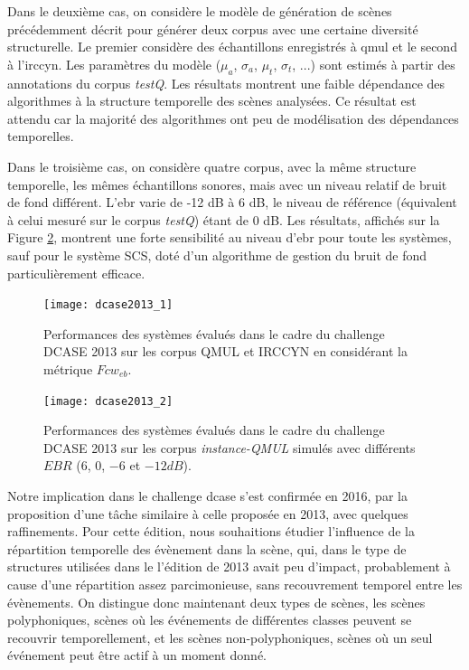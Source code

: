   Dans le deuxième cas, on considère le modèle de génération de scènes précédemment décrit pour générer deux corpus avec une certaine diversité structurelle. Le premier considère des échantillons enregistrés à qmul et le second à l'irccyn. Les paramètres du modèle ($\mu_a$, $\sigma_a$, $\mu_t$, $\sigma_t$, ...) sont estimés à partir des annotations du corpus \emph{testQ}. Les résultats montrent une faible dépendance des algorithmes à la structure temporelle des scènes analysées. Ce résultat est attendu car la majorité des algorithmes ont peu de modélisation des dépendances temporelles.

  Dans le troisième cas, on considère quatre corpus, avec la même structure temporelle, les mêmes échantillons sonores, mais avec un niveau relatif de bruit de fond différent. L'ebr varie de -12 dB à 6 dB, le niveau de référence (équivalent à celui mesuré sur le corpus \emph{testQ})  étant de 0 dB. Les résultats, affichés sur la Figure \ref{fig:ebr}, montrent une forte sensibilité au niveau d'ebr pour toute les systèmes, sauf pour le système SCS, doté d'un algorithme de gestion du bruit de fond particulièrement efficace.

  \begin{figure}[t]
  \texttt{[image: dcase2013\_1]}
  \caption{Performances des systèmes évalués dans le cadre du challenge DCASE 2013 sur les corpus QMUL et IRCCYN en considérant la métrique $Fcw_{eb}$.}
  \label{fig:irccyn}
  \vspace{-4em}
  \end{figure}

  \begin{figure}[t]
  \begin{center}
  \texttt{[image: dcase2013\_2]}
  \caption{Performances des systèmes évalués dans le cadre du challenge DCASE 2013 sur les corpus \emph{instance-QMUL} simulés avec différents $EBR$ ($6$, $0$, $-6$ et $-12dB$).}
  \label{fig:ebr}
  \end{center}
\vspace{-4em}
\end{figure}

  Notre implication dans le challenge dcase s'est confirmée en 2016\cite{mesa}, par la proposition d'une tâche similaire à celle proposée en 2013, avec quelques raffinements. Pour cette édition, nous souhaitions étudier l'influence de la répartition temporelle des évènement dans la scène, qui, dans le type de structures utilisées dans le l'édition de 2013 avait peu d'impact, probablement à cause d'une répartition assez parcimonieuse, sans recouvrement temporel entre les évènements. On distingue donc maintenant deux types de scènes, les scènes polyphoniques, scènes où les événements de différentes classes peuvent se recouvrir temporellement, et les scènes non-polyphoniques, scènes où un seul événement peut être actif à un moment donné.

